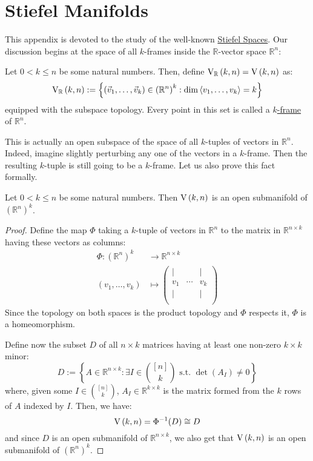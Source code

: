 \chapter{Stiefel Manifolds}\label{app:stiefel}
This appendix is devoted to the study of the well-known \ul{Stiefel Spaces}. Our discussion begins at the space of all $k$-frames inside the $\mathbb{R}$-vector space $\mathbb{R}^n$:
\begin{definition} Let $0<k\leq n$ be some natural numbers. Then, define $\St{k}{n}{\mathbb{R}}=\St{k}{n}$ as:
\[\St{k}{n}{\mathbb{R}}:=\left\{\left(\vec{v}_1,\ldots,\vec{v}_k\right)\in{\left(\mathbb{R}^n\right)}^k:\dim\left<v_1,\ldots,v_k\right>=k\right\}\]
equipped with the subspace topology. Every point in this set is called a \ul{$k$-frame} of $\mathbb{R}^n$.
\end{definition}
This is actually an open subspace of the space of all $k$-tuples of vectors in $\mathbb{R}^n$. Indeed, imagine slightly perturbing any one of the vectors in a $k$-frame. Then the resulting $k$-tuple is still going to be a $k$-frame. Let us also prove this fact formally.
\begin{proposition}\label{prop:St_open} Let $0<k\leq n$ be some natural numbers. Then $\St{k}{n}$ is an open submanifold of ${\left(\mathbb{R}^n\right)}^k$.
\end{proposition}
\begin{proof} Define the map $\Phi$ taking a $k$-tuple of vectors in $\mathbb{R}^n$ to the matrix in $\mathbb{R}^{n\times k}$ having these vectors as columns:
\begin{align*}
\Phi:{\left(\mathbb{R}^n\right)}^k&\to \mathbb{R}^{n\times k}\\[1em]
(v_1,\ldots,v_k)&\mapsto \left(\begin{array}{ccc}
|&&|\\[-.3em]
v_1&\cdots&v_k\\[-.3em]
|&&|\\
\end{array}\right)
\end{align*}
Since the topology on both spaces is the product topology and $\Phi$ respects it, $\Phi$ is a homeomorphism.

Define now the subset $D$ of all $n\times k$ matrices having at least one non-zero $k\times k$ minor:
\[D:=\left\{A\in\mathbb{R}^{n\times k}:\exists I\in\binom{[n]}{k}\text{ s.t. }\det(A_I)\neq0\right\}\]
where, given some $I\in\binom{[n]}{k}$, $A_I\in\mathbb{R}^{k\times k}$ is the matrix formed from the $k$ rows of $A$ indexed by $I$. Then, we have:
\[\St{k}{n}=\Phi^{-1}(D)\cong D\]
and since $D$ is an open submanifold of $\mathbb{R}^{n\times k}$, we also get that $\St{k}{n}$ is an open submanifold of ${\left(\mathbb{R}^n\right)}^k$.
\end{proof}

